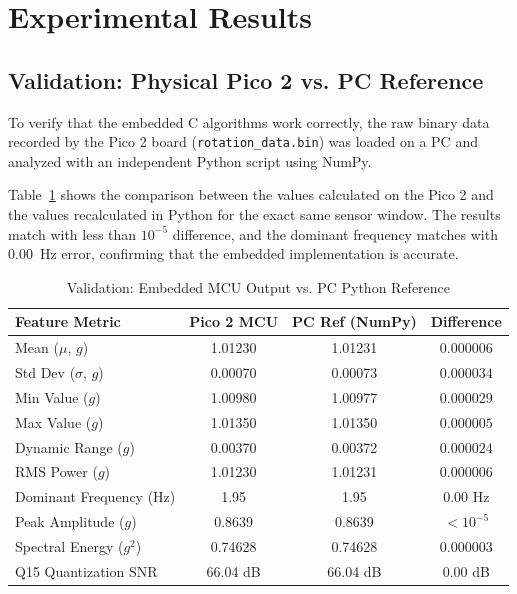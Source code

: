 \documentclass[conference]{IEEEtran}
\begin{document}
\section{Experimental Results}

\subsection{Validation: Physical Pico 2 vs. PC Reference}
To verify that the embedded C algorithms work correctly, the raw binary data recorded by the Pico 2 board (\texttt{rotation\_data.bin}) was loaded on a PC and analyzed with an independent Python script using NumPy.

Table~\ref{tab:comparison} shows the comparison between the values calculated on the Pico 2 and the values recalculated in Python for the exact same sensor window. The results match with less than $10^{-5}$ difference, and the dominant frequency matches with 0.00~Hz error, confirming that the embedded implementation is accurate.

\begin{table}[t]
\centering
\caption{Validation: Embedded MCU Output vs. PC Python Reference}
\label{tab:comparison}
\scriptsize
\begin{tabular}{@{}l@{\hspace{8pt}}c@{\hspace{8pt}}c@{\hspace{8pt}}c@{}}
\toprule
\textbf{Feature Metric} & \textbf{Pico 2 MCU} & \textbf{PC Ref (NumPy)} & \textbf{Difference} \\
\midrule
Mean ($\mu$, $g$)          & 1.01230  & 1.01231  & $0.000006$ \\
Std Dev ($\sigma$, $g$)    & 0.00070  & 0.00073  & $0.000034$ \\
Min Value ($g$)            & 1.00980  & 1.00977  & $0.000029$ \\
Max Value ($g$)            & 1.01350  & 1.01350  & $0.000005$ \\
Dynamic Range ($g$)        & 0.00370  & 0.00372  & $0.000024$ \\
RMS Power ($g$)            & 1.01230  & 1.01231  & $0.000006$ \\
\midrule
Dominant Frequency (Hz)    & 1.95     & 1.95     & 0.00 Hz \\
Peak Amplitude ($g$)       & 0.8639   & 0.8639   & $< 10^{-5}$ \\
Spectral Energy ($g^2$)    & 0.74628  & 0.74628  & $0.000003$ \\
\midrule
Q15 Quantization SNR       & 66.04 dB & 66.04 dB & 0.00 dB \\
\bottomrule
\end{tabular}
\end{table}
\end{document}
